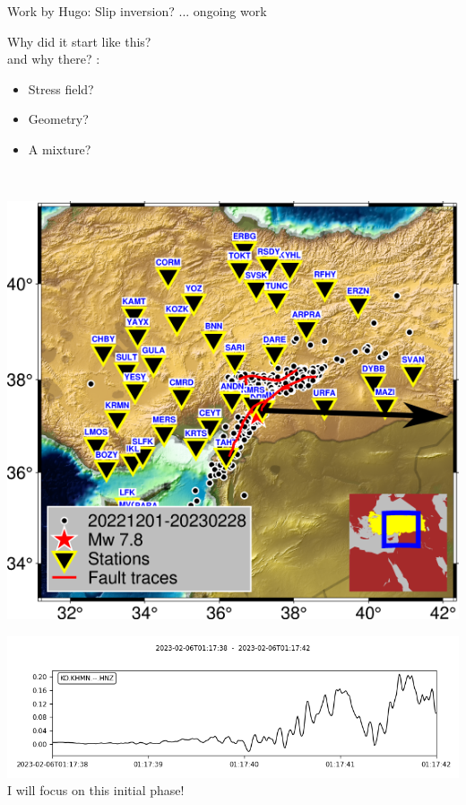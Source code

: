 \documentclass{beamer}
\begin{document}
\begin{frame}
 {Work by Hugo: Slip inversion? ... ongoing work}
 
 \vskip -0.5cm \begin{minipage}{0.51\linewidth}
  \hskip -0.8cm
\end{minipage} 
\begin{minipage}{0.47\linewidth}
\vskip 0.7cm Why did it start like this? \\ and why there? :
\vskip 0.1cm
\begin{itemize}
 \item Stress field?
 \item Geometry?
 \item A mixture?
\end{itemize}
\end{minipage} \\ \vskip 0.2cm 
\begin{minipage}{0.45\linewidth}
 \includegraphics[width=1\linewidth]{images/Map2.png}
\end{minipage}
\begin{minipage}{0.45\linewidth}
 \includegraphics[width=1.4\linewidth]{images/p2.png}
 \centering I will focus on this initial phase!
\end{minipage}
 
\end{frame}
\end{document}
